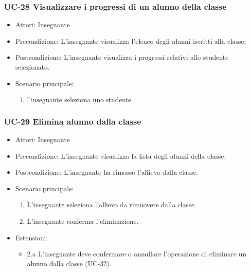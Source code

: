\subsubsection{UC-28 Visualizzare i progressi di un alunno della classe}
\begin{itemize}
	\item Attori: Insegnante
	\item Precondizione: L'insegnante visualizza l'elenco degli alunni iscritti alla classe;
	\item Postcondizione: L'insegnante visualizza i progressi relativi allo studente selezionato.
	\item Scenario principale:
	\begin{enumerate}
		\item l'insegnante seleziona uno studente. 
	\end{enumerate}
\end{itemize}

\subsubsection{UC-29 Elimina alunno dalla classe}		
\begin{itemize}
	\item Attori: Insegnante
	\item Precondizione: L'insegnante visualizza la lista degli alunni della classe.
	\item Postcondizione: L'insegnante ha rimosso l'allievo dalla classe.
	\item Scenario principale:
	\begin{enumerate}
		\item L'insegnante seleziona l'allievo da rimuovere dalla classe.
		\item L'insegnante conferma l'eliminazione.
	\end{enumerate}	
\item Estensioni:
\begin{itemize}
	\item 2.a L'insegnante deve confermare o annullare l'operazione di eliminare un alunno dalla classe (UC-32).
\end{itemize}	
\end{itemize}

